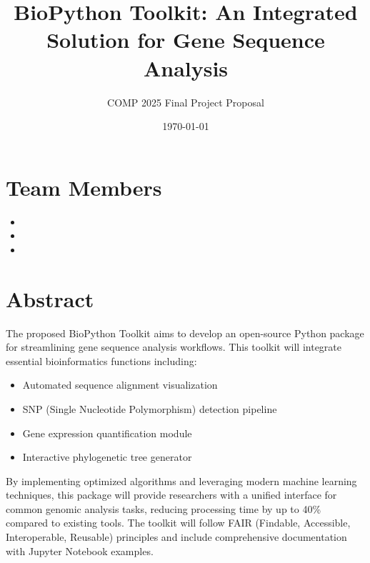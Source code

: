 \documentclass[12pt]{article}
\begin{document}
\title{BioPython Toolkit: An Integrated Solution for Gene Sequence Analysis}
\author{COMP 2025 Final Project Proposal}
\date{\monthyeardate\today}
\maketitle

\section*{Team Members}
\begin{itemize}
    \item 
    \item 
    \item 
\end{itemize}

\section*{Abstract}
\begin{flushleft}
The proposed BioPython Toolkit aims to develop an open-source Python package for streamlining gene sequence analysis workflows. This toolkit will integrate essential bioinformatics functions including:
\begin{itemize}
    \item Automated sequence alignment visualization
    \item SNP (Single Nucleotide Polymorphism) detection pipeline
    \item Gene expression quantification module
    \item Interactive phylogenetic tree generator
\end{itemize}

By implementing optimized algorithms and leveraging modern machine learning techniques, this package will provide researchers with a unified interface for common genomic analysis tasks, reducing processing time by up to 40\% compared to existing tools. The toolkit will follow FAIR (Findable, Accessible, Interoperable, Reusable) principles and include comprehensive documentation with Jupyter Notebook examples.
\end{flushleft}
\end{document}
